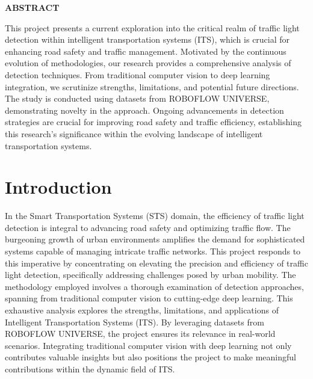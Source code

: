 \documentclass[12 pt]{report}
\begin{document}
\newpage
\begin{center}
  \begin{Large}
    \textbf{ABSTRACT}
  \end{Large}
\end{center}
\justify
This project presents a current exploration into the critical realm of traffic light detection within intelligent transportation systems (ITS), which is crucial for enhancing road safety and traffic management. Motivated by the continuous evolution of methodologies, our research provides a comprehensive analysis of detection techniques. From traditional computer vision to deep learning integration, we scrutinize strengths, limitations, and potential future directions. The study is conducted using datasets from ROBOFLOW UNIVERSE, demonstrating novelty in the approach. Ongoing advancements in detection strategies are crucial for improving road safety and traffic efficiency, establishing this research's significance within the evolving landscape of intelligent transportation systems.
\flushright

\newpage
\tableofcontents

\flushleft
\newpage
\chapter{Introduction}
\justify
In the Smart Transportation Systems (STS) domain, the efficiency of traffic light detection is integral to advancing road safety and optimizing traffic flow. The burgeoning growth of urban environments amplifies the demand for sophisticated systems capable of managing intricate traffic networks. This project responds to this imperative by concentrating on elevating the precision and efficiency of traffic light detection, specifically addressing challenges posed by urban mobility. The methodology employed involves a thorough examination of detection approaches, spanning from traditional computer vision to cutting-edge deep learning. This exhaustive analysis explores the strengths, limitations, and applications of Intelligent Transportation Systems (ITS). By leveraging datasets from ROBOFLOW UNIVERSE, the project ensures its relevance in real-world scenarios. Integrating traditional computer vision with deep learning not only contributes valuable insights but also positions the project to make meaningful contributions within the dynamic field of ITS.
\flushleft
\end{document}
